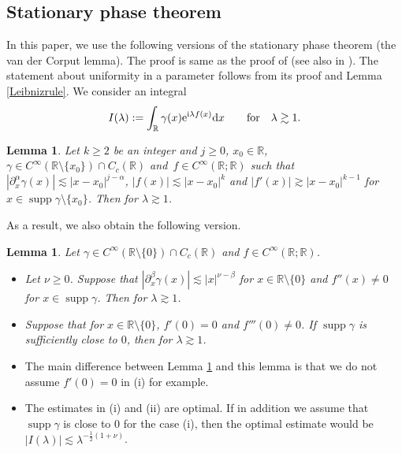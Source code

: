 \documentclass[pdftex]{sigma}
\numberwithin{equation}{section}
\newtheorem{Lemma}[Theorem]{Lemma}
\def\R{\mathbb{R}}%
\DeclareMathOperator{\supp}{supp}%
\def\a{\alpha}
\def\b{\beta}
\def\c{\gamma}
\def\l{\lambda}
\def\n{\nu}
\def\pa{\partial}
\begin{document}
\subsection{Stationary phase theorem}

In this paper, we use the following versions of the stationary phase theorem (the van der Corput lemma). The proof is same as the proof of \cite[Lemma 1.1.2]{So} (see also in \cite[p.~334]{S}). The statement about uniformity in a parameter follows from its proof and Lemma \ref{Leibnizrule}. We consider an integral
\begin{align*}
I(\l):=\int_{\R}\c(x){\rm e}^{{\rm i}\l f(x)}{\rm d}x\qquad \text{for}\quad \l\gtrsim 1.
\end{align*}

\begin{Lemma}\label{stphaselem}
Let $k\geq 2$ be an integer and $j\geq 0$, $x_0\in \R$, $\c\in C^{\infty}(\R\setminus \{x_0\})\cap C_c(\R)$ and~${f\in C^{\infty}(\R;\R)}$ such that $|\pa_x^{\a}\c(x)|\lesssim |x-x_0|^{j-\a}$, $|f(x)|\lesssim |x-x_0|^k$ and $|f'(x)|\gtrsim |x-x_0|^{k-1}$ for $x\in \supp \c\setminus \{x_0\}$.
Then \smash{$|I(\l)|\lesssim \l^{-\frac{j+1}{k}}$} for $\l\gtrsim 1$.
\end{Lemma}

As a result, we also obtain the following version.

\begin{Lemma}\label{stphaselem2}
Let $\c\in C^{\infty}(\R\setminus \{0\})\cap C_c(\R)$ and $f\in C^{\infty}(\R;\R)$.
\begin{itemize}\itemsep=0pt
\item[$(i)$] Let $\n\geq 0$. Suppose that $|\pa_x^{\b}\c(x)|\lesssim |x|^{\n-\b}$ for $x\in \R\setminus\{0\}$ and $f''(x)\neq 0$ for $x\in \supp \c$. Then \smash{$|I(\l)|\lesssim \l^{-\frac{1}{2}}$} for $\l\gtrsim 1$.

\item[$(ii)$] Suppose that \smash{$\big|\pa_x^{\b}\c(x)\big|\lesssim |x|^{\frac{1}{2}-\b}$} for $x\in \R\setminus\{0\}$, $f'(0)=0$ and $f'''(0)\neq 0$. If $\supp \c$ is sufficiently close to $0$, then \smash{$|I(\l)|\lesssim \l^{-\frac{1}{2}}$} for $\l\gtrsim 1$.
\end{itemize}
\end{Lemma}

\begin{Remark}\quad
\begin{itemize}\itemsep=0pt
\item[(1)] The main difference between Lemma \ref{stphaselem} and this lemma is that we do not assume $f'(0)=0$ in (i) for example.
\item[(2)] The estimates in (i) and (ii) are optimal. If in addition we assume that $\supp \c$ is close to $0$ for the case (i), then the optimal estimate would be $|I(\l)|\lesssim \l^{-\frac{1}{2}(1+\n)}$.
 \end{itemize}
\end{Remark}
\end{document}
